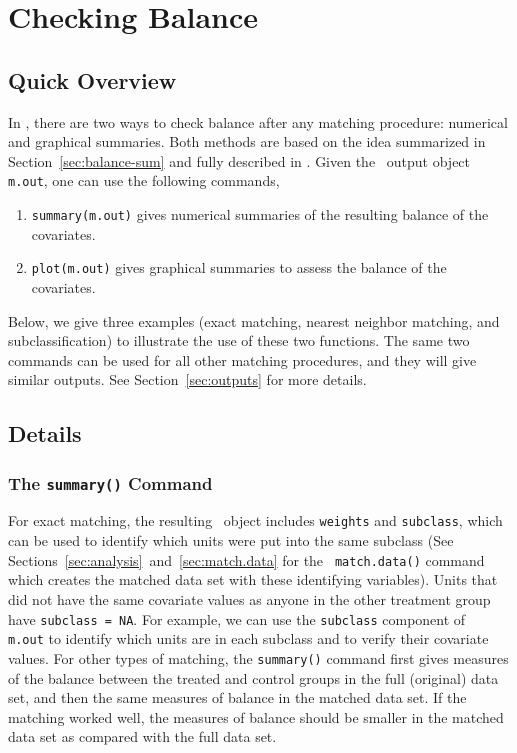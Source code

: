 \section{Checking Balance}
\label{sec:balance}

\subsection{Quick Overview}

In \MatchIt, there are two ways to check balance after any matching
procedure: numerical and graphical summaries. Both methods are based
on the idea summarized in Section~\ref{sec:balance-sum} and fully
described in \citet*{HoImaKin05}. Given the \MatchIt\ output object
{\tt m.out}, one can use the following commands,
\begin{enumerate}
\item \texttt{summary(m.out)} gives numerical summaries of the
  resulting balance of the covariates.
  
\item \texttt{plot(m.out)} gives graphical summaries to assess the
  balance of the covariates.
\end{enumerate}
Below, we give three examples (exact matching, nearest neighbor
matching, and subclassification) to illustrate the use of these two
functions. The same two commands can be used for all other matching
procedures, and they will give similar outputs.  See
Section~\ref{sec:outputs} for more details.


\subsection{Details}


\subsubsection{The {\tt summary()} Command}

For exact matching, the resulting \MatchIt\ object includes
\texttt{weights} and \texttt{subclass}, which can be used to identify
which units were put into the same subclass (See
Sections~\ref{sec:analysis}~and~\ref{sec:match.data} for the {\tt
  match.data()} command which creates the matched data set with these
identifying variables).  Units that did not have the same covariate
values as anyone in the other treatment group have \texttt{subclass =
  NA}.  For example, we can use the {\tt subclass} component of {\tt
  m.out} to identify which units are in each subclass and to verify
their covariate values.  For other types of matching, the
\texttt{summary()} command first gives measures of the balance between
the treated and control groups in the full (original) data set, and
then the same measures of balance in the matched data set.  If the
matching worked well, the measures of balance should be smaller in the
matched data set as compared with the full data set.

